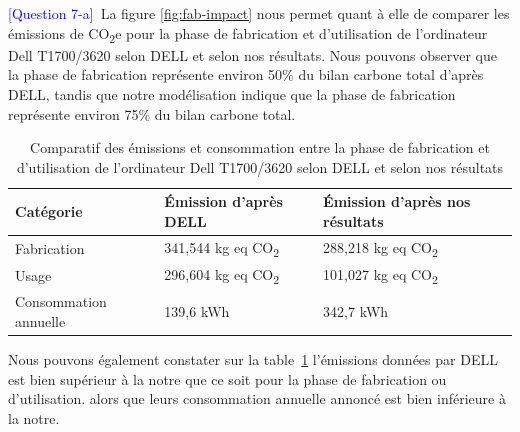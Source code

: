 \documentclass[12pt,a4paper]{paper}
\begin{document}
\textcolor{blue}{[Question 7-a]}~La figure \ref{fig:fab-impact} nous permet quant à elle de comparer les émissions de CO\textsubscript{2}e pour la phase de fabrication et d'utilisation de l'ordinateur Dell T1700/3620 selon DELL et selon nos résultats. Nous pouvons observer que la phase de fabrication représente environ 50\% du bilan carbone total d'après DELL, tandis que notre modélisation indique que la phase de fabrication représente environ 75\% du bilan carbone total.\\
\begin{table}[H]
    \centering
    \begin{tabular}{|p{2.5cm}|p{2.5cm}|p{2.5cm}|}
    \hline
    \textbf{Catégorie} & \textbf{Émission d'après DELL} & \textbf{Émission d'après nos résultats} \\
    \hline
    Fabrication & 341{,}544 kg eq CO\textsubscript{2} & 288{,}218 kg eq CO\textsubscript{2} \\ \hline
    Usage & 296{,}604 kg eq CO\textsubscript{2} & 101{,}027 kg eq CO\textsubscript{2} \\ \hline
    Consommation annuelle & 139{,}6 kWh & 342{,}7 kWh \\
    \hline
    \end{tabular}
    \caption{Comparatif des émissions et consommation entre la phase de fabrication et d'utilisation de l'ordinateur Dell T1700/3620 selon DELL et selon nos résultats}
    \label{tab:comparatif}
\end{table}
Nous pouvons également constater sur la table~\ref{tab:comparatif} l'émissions données par DELL est bien supérieur à la notre que ce soit pour la phase de fabrication ou d'utilisation. alors que leurs consommation annuelle annoncé est bien inférieure à la notre.
\end{document}

